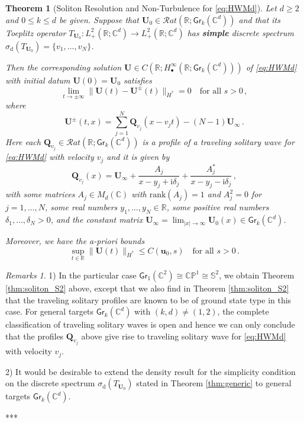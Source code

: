 \documentclass[11pt,reqno]{amsart}
\newtheorem{thm}{Theorem}[section]
\theoremstyle{definition}
\theoremstyle{remark}
\theoremstyle{remark}
\newtheorem*{remarks*}{Remarks}
\numberwithin{equation}{section}
\newcommand{\C}{\mathbb{C}}
\newcommand{\R}{\mathbb{R}}
\newcommand{\Ss}{\mathbb{S}}
\newcommand{\rank}{\mathrm{rank}}
\newcommand{\Qv}{\mathbf{Q}}
\newcommand{\ii}{\mathrm{i}}
\newcommand{\uu}{\mathbf{u}}
\newcommand{\Ub}{\mathbf{U}}
\newcommand{\Gr}{\mathsf{Gr}}
\begin{document}
\begin{thm}[Soliton Resolution and Non-Turbulence for \eqref{eq:HWMd}] \label{thm:soliton}
Let $d \geq 2$ and $0 \leq k \leq d$ be given. Suppose that $\Ub_0 \in \mathcal{R}at(\R; \Gr_k(\C^d))$ and that its Toeplitz operator $T_{\Ub_0} : L^2_+(\R; \C^d) \to L^2_+(\R; \C^d)$ has \textbf{simple} discrete spectrum $\sigma_{\mathrm{d}}(T_{\Ub_0})= \{v_1, \ldots, v_N \}$. 

Then the corresponding solution $\Ub \in C(\R; H^\infty_\bullet(\R; \Gr_k(\C^d)))$ of  \eqref{eq:HWMd} with initial datum $\Ub(0) = \Ub_0$ satisfies
$$
\lim_{t \to \pm \infty} \| \Ub(t) - \Ub^\pm(t) \|_{\dot{H}^s} = 0 \quad \mbox{for all $s > 0$} \, ,
$$
where
$$
\Ub^{\pm}(t,x) =  \sum_{j=1}^N \Qv_{v_j}(x-v_j t) - (N-1) \Ub_\infty \, .
$$
Here each $\Qv_{v_j} \in \mathcal{R}at(\R; \Gr_k(\C^d))$ is a profile of a traveling solitary wave for \eqref{eq:HWMd} with velocity $v_j$ and it is given by
$$
\Qv_{v_j}(x) =  \Ub_\infty + \frac{A_j}{x- y_j  + \ii \delta_j} + \frac{A_j^*}{x-y_j- \ii \delta_j} \, ,
$$
with some matrices $A_j \in M_d(\C)$ with $\rank(A_j)=1$ and $A_j^2 = 0$ for $j =1, \ldots, N$, some real numbers $y_1, \ldots, y_N \in \R$, some positive real numbers $\delta_1, \ldots, \delta_N > 0$, and the constant matrix $\Ub_\infty = \lim_{|x| \to \infty} \Ub_0(x) \in \Gr_k(\C^d)$.  

Moreover, we have the a-priori bounds
$$
\sup_{t \in \R} \| \Ub(t) \|_{\dot{H}^s} \leq C(\uu_0,s) \quad \mbox{for all $s >0$} \, .
$$ 
\end{thm}

\begin{remarks*}
1) In the particular case $\Gr_1(\C^2) \cong  \mathbb{CP}^1 \cong \Ss^2$, we obtain Theorem \ref{thm:soliton_S2} above, except that  we also find in Theorem \ref{thm:soliton_S2} that the traveling solitary profiles  are  known to be of ground state type in this case. For general targets $\Gr_k(\C^d)$ with $(k,d) \neq (1,2)$, the complete classification of traveling solitary waves is open and hence we can only conclude that the profiles $\Qv_{v_j}$ above give rise to traveling solitary wave for \eqref{eq:HWMd} with velocity $v_j$.

2) It would be desirable to extend the density result for the simplicity condition on the discrete spectrum $\sigma_{\mathrm{d}}(T_{\Ub_0})$ stated in Theorem \ref{thm:generic} to general targets $\Gr_k(\C^d)$.
\end{remarks*}

\bigskip
\begin{center}
***
\end{center}
\medskip
\end{document}
